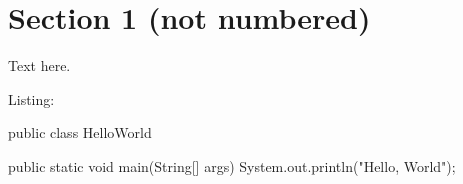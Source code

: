 \documentclass[a4paper,11pt]{report}
\begin{document}
\section*{Section 1 (not numbered)}

Text here.

Listing:

\begin{javacode}
public class HelloWorld {

    public static void main(String[] args) {
        System.out.println("Hello, World");
    }

}
\end{javacode}
\end{document}
